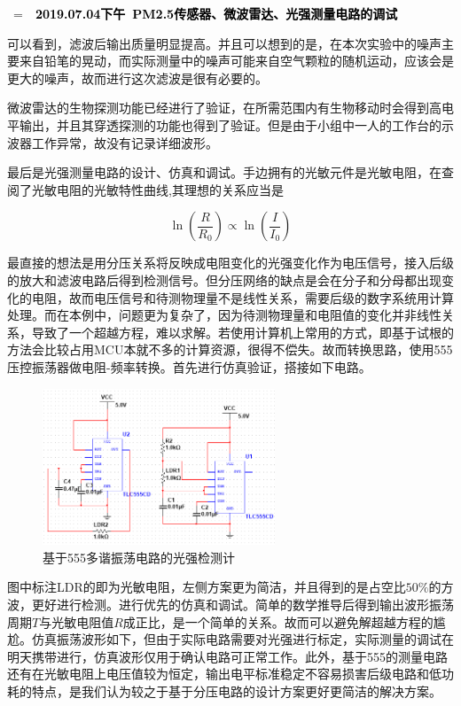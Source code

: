 \documentclass[a4paper, 11pt]{article} %
\makeatletter
\newlength\sidebar
\newlength\envborder
\def\esefcolorbox#1#{\esecolor@fbox{#1}}
\def\esecolor@fbox#1#2#3{%
   \color@b@x{\fboxsep\z@\color#1{#2}\fboxs}{\color#1{#3}}}
\newenvironment{eseframed}{%
   \def\FrameCommand{\fboxrule=\the\sidebar  \fboxsep=\the\envborder%
   \esefcolorbox{exampleborder}{examplebg}}%
   \MakeFramed{\FrameRestore}}%
  {\endMakeFramed}
\newcounter{diary}
\newenvironment{diary}[2]
 {\par\medskip\refstepcounter{diary}%
 \hbox{%
 \fboxsep=\the\sidebar\hspace{-\envborder}\hspace{-0.5\sidebar}%
 \colorbox{exampleborder}{%
 \hspace{\envborder}\footnotesize\sffamily\bfseries%
 \textcolor{black}{{#1}\ {#2}\enspace\hspace{\envborder}}
 }
 }
 \nointerlineskip\vspace{-\topsep}%
 \begin{eseframed}\noindent\ignorespaces%
 }
 {\end{eseframed}\vspace{-\baselineskip}\medskip}
\makeatother
\begin{document}
\begin{diary}{2019.07.04下午}{PM2.5传感器、微波雷达、光强测量电路的调试}
  可以看到，滤波后输出质量明显提高。并且可以想到的是，在本次实验中的噪声主要来自铅笔的晃动，而实际测量中的噪声可能来自空气颗粒的随机运动，应该会是更大的噪声，故而进行这次滤波是很有必要的。
  
  微波雷达的生物探测功能已经进行了验证，在所需范围内有生物移动时会得到高电平输出，并且其穿透探测的功能也得到了验证。但是由于小组中一人的工作台的示波器工作异常，故没有记录详细波形。
  
  最后是光强测量电路的设计、仿真和调试。手边拥有的光敏元件是光敏电阻，在查阅了光敏电阻的光敏特性曲线,其理想的关系应当是
  
  \begin{equation*}
    \ln(\frac{R}{R_0}) \propto \ln(\frac{I}{I_0})
  \end{equation*}
  
  最直接的想法是用分压关系将反映成电阻变化的光强变化作为电压信号，接入后级的放大和滤波电路后得到检测信号。但分压网络的缺点是会在分子和分母都出现变化的电阻，故而电压信号和待测物理量不是线性关系，需要后级的数字系统用计算处理。而在本例中，问题更为复杂了，因为待测物理量和电阻值的变化并非线性关系，导致了一个超越方程，难以求解。若使用计算机上常用的方式，即基于试根的方法会比较占用MCU本就不多的计算资源，很得不偿失。故而转换思路，使用555压控振荡器做电阻-频率转换。首先进行仿真验证，搭接如下电路。
  
  \begin{figure}[H]
    \centering
    \includegraphics[width = 0.618\textwidth]{555_sim.jpg}
    \caption{基于555多谐振荡电路的光强检测计}
  \end{figure}
  
  图中标注LDR的即为光敏电阻，左侧方案更为简洁，并且得到的是占空比$50\%$的方波，更好进行检测。进行优先的仿真和调试。简单的数学推导后得到输出波形振荡周期$T$与光敏电阻值$R$成正比，是一个简单的关系。故而可以避免解超越方程的尴尬。仿真振荡波形如下，但由于实际电路需要对光强进行标定，实际测量的调试在明天携带进行，仿真波形仅用于确认电路可正常工作。此外，基于555的测量电路还有在光敏电阻上电压值较为恒定，输出电平标准稳定不容易损害后级电路和低功耗的特点，是我们认为较之于基于分压电路的设计方案更好更简洁的解决方案。
  

\end{diary}
\end{document}
